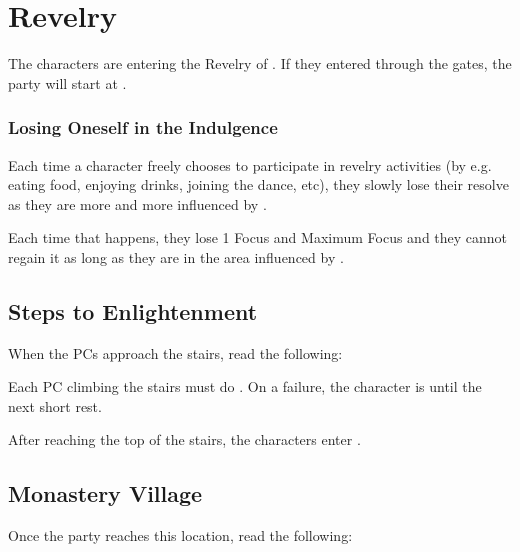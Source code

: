 \section{Revelry}
\label{sec:revelry}

The characters are entering the Revelry of \npcFractionCult{}. If they entered through the gates, the party will start at .

\subsubsection{Losing Oneself in the Indulgence}

Each time a character freely chooses to participate in revelry activities (by e.g. eating food, enjoying drinks, joining the dance, etc), they slowly lose their resolve as they are more and more influenced by \npcHeartRevel{}.

Each time that happens, they lose 1 Focus and Maximum Focus and they cannot regain it as long as they are in the area influenced by \npcHeartRevelTitle{}.






\subsection{Steps to Enlightenment}
\label{ssec:revelryStairs}

When the PCs approach the stairs, read the following:


Each PC climbing the stairs must do . On a failure, the character is \exhausted{} until the next short rest.

After reaching the top of the stairs, the characters enter .




\subsection{Monastery Village}
\label{ssec:revelryVillage}

Once the party reaches this location, read the following:

